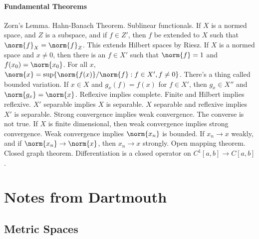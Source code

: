 \documentclass[crop=false,class=book,oneside]{standalone}
\begin{document}
            \subsubsection{Fundamental Theorems}
                Zorn's Lemma. Hahn-Banach Theorem. Sublinear functionals.
                If $X$ is a normed space, and $Z$ is a subspace, and if
                $f\in{Z'}$, then $f$ be extended to $X$ such that
                $\norm{f}_{X}=\norm{f}_{Z}$.
                This extends Hilbert spaces by Riesz.
                If $X$ is a normed space
                and $x\ne{0}$, then there is an $f\in{X'}$ such that
                $\norm{f}=1$ and $f(x_{0})=\norm{x_{0}}$.
                For all $x$,
                $\norm{x}=\sup\{\norm{f(x)}/\norm{f}:f\in{X'},f\ne{0}\}$.
                There's a thing called bounded variation.
                If $x\in{X}$ and
                $g_{x}(f)=f(x)$ for $f\in{X'}$, then
                $g_{x}\in{X''}$ and $\norm{g_{x}}=\norm{x}$.
                Reflexive implies complete.
                Finite and Hilbert implies reflexive.
                $X'$ separable implies $X$ is separable.
                $X$ separable and reflexive implies
                $X'$ is separable.
                Strong convergence implies weak convergence.
                The converse is not true. If $X$ is finite
                dimensional, then weak convergence
                implies strong convergence. Weak convergence implies
                $\norm{x_{n}}$ is bounded. If
                $x_{n}\rightarrow{x}$ weakly, and if
                $\norm{x_{n}}\rightarrow\norm{x}$, then
                $x_{n}\rightarrow{x}$ strongly.
                Open mapping theorem.
                Closed graph theorem.
                Differentiation is a closed operator on
                $C^{1}[a,b]\rightarrow{C[a,b]}$.
    \chapter{Notes from Dartmouth}
    \section{Metric Spaces}
\end{document}
